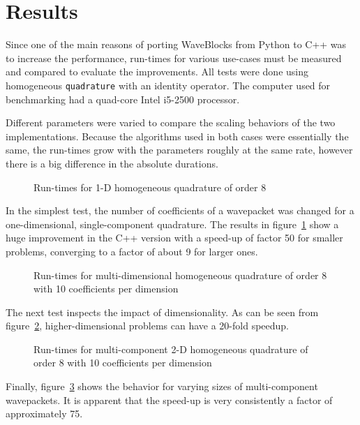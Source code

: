 \section{Results}

Since one of the main reasons of porting WaveBlocks from Python to C++ was to
increase the performance, run-times for various use-cases must be measured and
compared to evaluate the improvements.
All tests were done using homogeneous \texttt{quadrature} with an identity
operator.
The computer used for benchmarking had a quad-core Intel i5-2500 processor.

Different parameters were varied to compare the scaling behaviors of the two
implementations.
Because the algorithms used in both cases were essentially the same, the
run-times grow with the parameters roughly at the same rate, however there is a
big difference in the absolute durations.

\begin{figure}
  \center
  
  \caption{Run-times for 1-D homogeneous quadrature of order 8}
  \label{fig:speedup1d}
\end{figure}

In the simplest test, the number of coefficients of a wavepacket was changed
for a one-dimensional, single-component quadrature.
The results in figure~\ref{fig:speedup1d} show a huge improvement in the C++
version with a speed-up of factor 50 for smaller problems, converging to a
factor of about 9 for larger ones.

\begin{figure}
  \center
  
  \caption{Run-times for multi-dimensional homogeneous quadrature of order 8
    with 10 coefficients per dimension}
  \label{fig:speedupnd}
\end{figure}

The next test inspects the impact of dimensionality.
As can be seen from figure~\ref{fig:speedupnd}, higher-dimensional problems can
have a 20-fold speedup.

\begin{figure}
  \center
  
  \caption{Run-times for multi-component 2-D homogeneous quadrature of order 8
    with 10 coefficients per dimension}
  \label{fig:speedupncomps}
\end{figure}

Finally, figure~\ref{fig:speedupncomps} shows the behavior for varying sizes
of multi-component wavepackets.
It is apparent that the speed-up is very consistently a factor of approximately
75.

